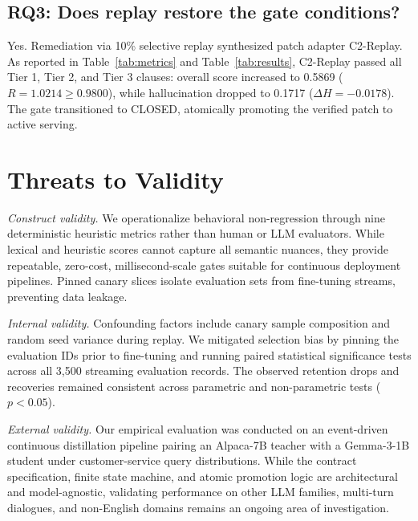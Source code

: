 \documentclass[conference]{IEEEtran}
\begin{document}
\subsection{RQ3: Does replay restore the gate conditions?}
Yes. Remediation via 10\% selective replay synthesized patch adapter C2-Replay. As reported in Table~\ref{tab:metrics} and Table~\ref{tab:results}, C2-Replay passed all Tier 1, Tier 2, and Tier 3 clauses: overall score increased to 0.5869 ($R = 1.0214 \ge 0.9800$), while hallucination dropped to 0.1717 ($\Delta H = -0.0178$). The gate transitioned to CLOSED, atomically promoting the verified patch to active serving.

\section{Threats to Validity}
\textit{Construct validity.} We operationalize behavioral non-regression through nine deterministic heuristic metrics rather than human or LLM evaluators. While lexical and heuristic scores cannot capture all semantic nuances, they provide repeatable, zero-cost, millisecond-scale gates suitable for continuous deployment pipelines. Pinned canary slices isolate evaluation sets from fine-tuning streams, preventing data leakage.

\textit{Internal validity.} Confounding factors include canary sample composition and random seed variance during replay. We mitigated selection bias by pinning the evaluation IDs prior to fine-tuning and running paired statistical significance tests across all 3,500 streaming evaluation records. The observed retention drops and recoveries remained consistent across parametric and non-parametric tests ($p < 0.05$).

\textit{External validity.} Our empirical evaluation was conducted on an event-driven continuous distillation pipeline pairing an Alpaca-7B teacher with a Gemma-3-1B student under customer-service query distributions. While the contract specification, finite state machine, and atomic promotion logic are architectural and model-agnostic, validating performance on other LLM families, multi-turn dialogues, and non-English domains remains an ongoing area of investigation.
\end{document}
